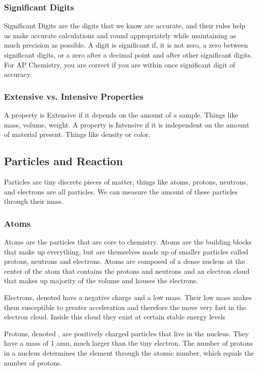         \subsubsection{Significant Digits}
        Significant Digits are the digits that we know are accurate, and their rules help us make accurate calculations and round appropriately while maintaining as much precision as possible. A digit is significant if, it is not zero, a zero between significant digits,  or a zero after a decimal point and after other significant digits. For AP Chemistry, you are correct if you are within once significant digit of accuracy. 
        \subsubsection{Extensive vs. Intensive Properties}
        A property is Extensive if it depends on the amount of a sample. Things like mass, volume, weight. A property is Intensive if it is independent on the amount of material present. Things like density or color. 
    \subsection{Particles and Reaction}
    Particles are tiny discrete pieces of matter, things like atoms, protons, neutrons, and electrons are all particles. We can measure the amount of these particles through their mass.

    \subsubsection{Atoms}
    Atoms are the particles that are core to chemistry. Atoms are the building blocks that make up everything, but are themselves made up of smaller particles called protons, neutrons and electrons. Atoms are composed of a dense nucleus at the center of the atom that contains the protons and neutrons and an electron cloud that makes up majority of the volume and houses the electrons.

    Electrons, denoted  have a negative charge and a low mass. Their low mass makes them susceptible to greater acceleration and therefore the move very fast in the electron cloud. Inside this cloud they exist at certain stable energy levels

    Protons, denoted , are positively charged particles that live in the nucleus. They have a mass of 1 amu, much larger than the tiny electron. The number of protons in a nucleus determines the element through the atomic number, which equals the number of protons.

